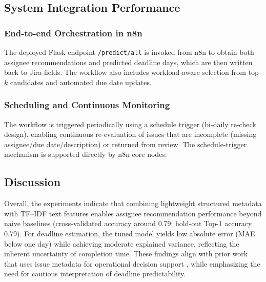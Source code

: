 \documentclass[conference]{IEEEtran}
\begin{document}
\subsection{System Integration Performance}

\subsubsection{End-to-end Orchestration in n8n}
The deployed Flask endpoint \texttt{/predict/all} is invoked from n8n to obtain both assignee recommendations and predicted deadline days, which are then written back to Jira fields. The workflow also includes workload-aware selection from top-$k$ candidates and automated due date updates.

\subsubsection{Scheduling and Continuous Monitoring}
The workflow is triggered periodically using a schedule trigger (bi-daily re-check design), enabling continuous re-evaluation of issues that are incomplete (missing assignee/due date/description) or returned from review. The schedule-trigger mechanism is supported directly by n8n core nodes.

\subsection{Discussion}

Overall, the experiments indicate that combining lightweight structured metadata with TF--IDF text features enables assignee recommendation performance beyond naive baselines (cross-validated accuracy around 0.79; hold-out Top-1 accuracy 0.79). For deadline estimation, the tuned model yields low absolute error (MAE below one day) while achieving moderate explained variance, reflecting the inherent uncertainty of completion time. These findings align with prior work that uses issue metadata for operational decision support \cite{razi2023_projectml}, while emphasizing the need for cautious interpretation of deadline predictability.
\end{document}
